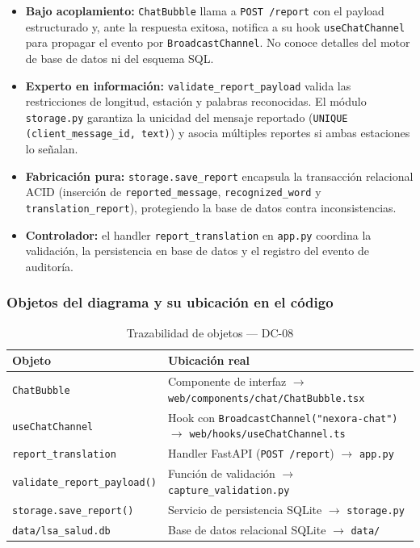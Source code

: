 \begin{itemize}[leftmargin=*, itemsep=2pt]
    \item \textbf{Bajo acoplamiento:} \texttt{ChatBubble} llama a
    \texttt{POST /report} con el payload estructurado y, ante la respuesta
    exitosa, notifica a su hook \texttt{useChatChannel} para propagar el
    evento por \texttt{BroadcastChannel}. No conoce detalles del motor de
    base de datos ni del esquema SQL.
    \item \textbf{Experto en información:} \texttt{validate\_report\_payload}
    valida las restricciones de longitud, estación y palabras reconocidas.
    El módulo \texttt{storage.py} garantiza la unicidad del mensaje
    reportado (\texttt{UNIQUE (client\_message\_id, text)}) y asocia
    múltiples reportes si ambas estaciones lo señalan.
    \item \textbf{Fabricación pura:} \texttt{storage.save\_report}
    encapsula la transacción relacional ACID (inserción de
    \texttt{reported\_message}, \texttt{recognized\_word} y
    \texttt{translation\_report}), protegiendo la base de datos contra
    inconsistencias.
    \item \textbf{Controlador:} el handler \texttt{report\_translation} en
    \texttt{app.py} coordina la validación, la persistencia en base de
    datos y el registro del evento de auditoría.
\end{itemize}

\subsubsection{Objetos del diagrama y su ubicación en el código}

\begin{table}[H]
\centering
\begin{tabularx}{\textwidth}{@{}l X@{}}
\toprule
\textbf{Objeto} & \textbf{Ubicación real} \\
\midrule
\texttt{ChatBubble} & Componente de interfaz $\rightarrow$ \texttt{web/components/chat/ChatBubble.tsx} \\
\texttt{useChatChannel} & Hook con \texttt{BroadcastChannel("nexora-chat")} $\rightarrow$ \texttt{web/hooks/useChatChannel.ts} \\
\texttt{report\_translation} & Handler FastAPI (\texttt{POST /report}) $\rightarrow$ \texttt{app.py} \\
\texttt{validate\_report\_payload()} & Función de validación $\rightarrow$ \texttt{capture\_validation.py} \\
\texttt{storage.save\_report()} & Servicio de persistencia SQLite $\rightarrow$ \texttt{storage.py} \\
\texttt{data/lsa\_salud.db} & Base de datos relacional SQLite $\rightarrow$ \texttt{data/} \\
\bottomrule
\end{tabularx}
\caption{Trazabilidad de objetos --- DC-08}
\label{tab:col-objetos-dc08}
\end{table}

